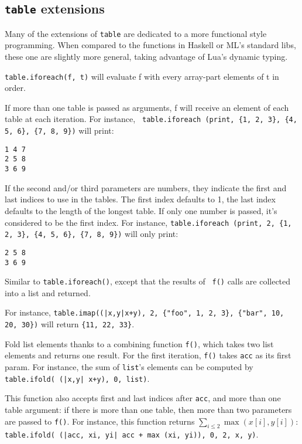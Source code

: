 \subsection{{\tt table} extensions}

Many of the extensions of {\tt table} are dedicated to a more
functional style programming. When compared to the functions in
Haskell or ML's standard libs, these one are slightly more general,
taking advantage of Lua's dynamic typing.


{\tt table.iforeach(f, t)} will evaluate f with every array-part
elements of t in order.

If more than one table is passed as arguments, f will receive an
element of each table at each iteration. For instance, {\tt
  table.iforeach (print, \{1, 2, 3\}, \{4, 5, 6\}, \{7, 8, 9\})} will
print:
\begin{verbatim}
1 4 7
2 5 8
3 6 9
\end{verbatim}

If the second and/or third parameters are numbers, they indicate the
first and last indices to use in the tables. The first index defaults
to 1, the last index defaults to the length of the longest table. If
only one number is passed, it's considered to be the first index. For
instance,
{\tt table.iforeach (print, 2, \{1, 2, 3\}, \{4, 5, 6\}, \{7, 8, 9\})}
will only print:
\begin{verbatim}
2 5 8
3 6 9
\end{verbatim}


Similar to {\tt table.iforeach()}, except that the results of {\tt
  f()} calls are collected into a list and returned.

For instance, {\tt table.imap((|x,y|x+y), 2, \{"foo", 1, 2, 3\},
  \{"bar", 10, 20, 30\})} will return {\tt\{11, 22, 33\}}.


Fold list elements thanks to a combining function {\tt f()}, which
takes two list elements and returns one result. For the first
iteration, {\tt f()} takes {\tt acc} as its first param. For instance,
the sum of {\tt list}'s elements can be computed by {\tt table.ifold(
  (|x,y| x+y), 0, list)}.

This function also accepts first and last indices after {\tt acc}, and
more than one table argument: if there is more than one table, then
more than two parameters are passed to {\tt f()}. For instance, this
function returns $\sum_{i\le2} \max(x[i], y[i])$: {\tt
  table.ifold( (|acc, xi, yi| acc + max (xi, yi)), 0, 2, x, y)}.

